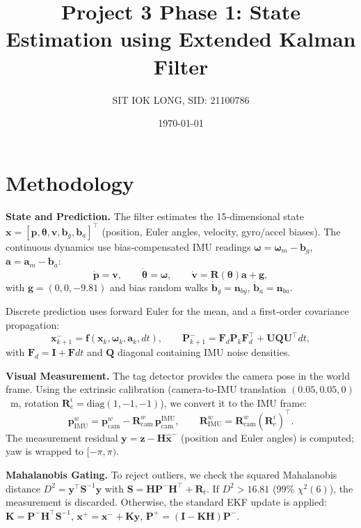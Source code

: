\documentclass[11pt]{article}
\title{Project 3 Phase 1: State Estimation using Extended Kalman Filter}
\author{SIT IOK LONG, SID: 21100786}
\date{\today}
\begin{document}
\maketitle

\section{Methodology}
\vspace{-5pt}
\textbf{State and Prediction.}
The filter estimates the 15‑dimensional state
$\mathbf{x}=[\mathbf{p},\boldsymbol{\theta},\mathbf{v},\mathbf{b}_g,\mathbf{b}_a]^\top$
(position, Euler angles, velocity, gyro/accel biases). The continuous dynamics use bias‑compensated IMU readings $\boldsymbol{\omega}=\boldsymbol{\omega}_m-\mathbf{b}_g$, $\mathbf{a}=\mathbf{a}_m-\mathbf{b}_a$:
\[
\dot{\mathbf{p}}=\mathbf{v},\qquad \dot{\boldsymbol{\theta}}=\boldsymbol{\omega},\qquad
\dot{\mathbf{v}}=\mathbf{R}(\boldsymbol{\theta})\mathbf{a}+\mathbf{g},
\]
with $\mathbf{g}=(0,0,-9.81)$ and bias random walks $\dot{\mathbf{b}}_g=\mathbf{n}_{bg}$, $\dot{\mathbf{b}}_a=\mathbf{n}_{ba}$.

Discrete prediction uses forward Euler for the mean, and a first‑order covariance propagation:
\[
\mathbf{x}_{k+1}^- = \mathbf{f}(\mathbf{x}_k,\boldsymbol{\omega}_k,\mathbf{a}_k,dt),\qquad
\mathbf{P}_{k+1}^- = \mathbf{F}_d \mathbf{P}_k \mathbf{F}_d^\top + \mathbf{U}\mathbf{Q}\mathbf{U}^\top dt,
\]
with $\mathbf{F}_d=\mathbf{I}+\mathbf{F}dt$ and $\mathbf{Q}$ diagonal containing IMU noise densities.

\textbf{Visual Measurement.}
The tag detector provides the camera pose in the world frame. Using the extrinsic calibration (camera‑to‑IMU translation $(0.05,0.05,0)$~m, rotation $\mathbf{R}_c^i=\mathrm{diag}(1,-1,-1)$), we convert it to the IMU frame:
\[
\mathbf{p}_{\mathrm{IMU}}^w = \mathbf{p}_{\mathrm{cam}}^w - \mathbf{R}_{\mathrm{cam}}^w\,\mathbf{p}_{\mathrm{cam}}^{\mathrm{IMU}},\qquad
\mathbf{R}_{\mathrm{IMU}}^w = \mathbf{R}_{\mathrm{cam}}^w (\mathbf{R}_c^i)^\top.
\]
The measurement residual $\mathbf{y}=\mathbf{z}-\mathbf{H}\hat{\mathbf{x}}^-$ (position and Euler angles) is computed; yaw is wrapped to $[-\pi,\pi)$.

\textbf{Mahalanobis Gating.}
To reject outliers, we check the squared Mahalanobis distance
$D^2 = \mathbf{y}^\top \mathbf{S}^{-1}\mathbf{y}$ with $\mathbf{S}=\mathbf{H}\mathbf{P}^-\mathbf{H}^\top+\mathbf{R}_t$.
If $D^2 > 16.81$ (99\% $\chi^2(6)$), the measurement is discarded. Otherwise, the standard EKF update is applied:
$\mathbf{K}=\mathbf{P}^-\mathbf{H}^\top\mathbf{S}^{-1}$, $\mathbf{x}^+=\mathbf{x}^-+\mathbf{K}\mathbf{y}$, $\mathbf{P}^+=(\mathbf{I}-\mathbf{K}\mathbf{H})\mathbf{P}^-$.
\end{document}
